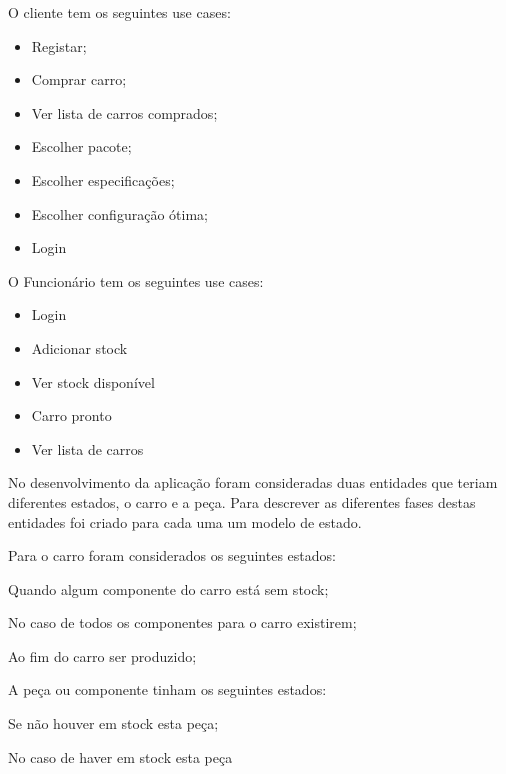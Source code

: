 \documentclass[10pt, a4paper]{article}
\begin{document}
O cliente tem os seguintes use cases:
\begin{itemize}
\item Registar;
\item Comprar carro;
\item Ver lista de carros comprados;
\item Escolher pacote;
\item Escolher especificações;
\item Escolher configuração ótima;
\item Login
\end{itemize}
O Funcionário tem os seguintes use cases:
\begin{itemize}
\item Login
\item Adicionar stock
\item Ver stock disponível
\item Carro pronto
\item Ver lista de carros
\end{itemize}

No desenvolvimento da aplicação foram consideradas duas entidades que teriam diferentes estados, o carro e a peça. Para descrever as diferentes fases destas entidades foi criado para cada uma um modelo de estado.

Para o carro foram considerados os seguintes estados:
\begin{description}[align=left]
\item [Em espera] Quando algum componente do carro está sem stock;
\item [Em produção] No caso de todos os componentes para o carro existirem;
\item [Pronto] Ao fim do carro ser produzido;
\end{description}

A peça ou componente tinham os seguintes estados:
\begin{description}[align=left]
\item [Esgotado] Se não houver em stock esta peça;
\item [Disponível] No caso de haver em stock esta peça
\end{description}
\end{document}
